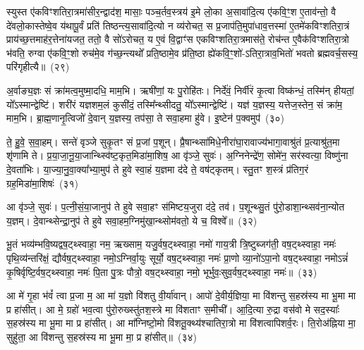 स्युस्त ए॑कविꣳशतिरा॒त्रमा॑सीर॒न्द्वाद॑श॒ मासाः॒ पञ्च॒र्तव॒स्त्रय॑ इ॒मे लो॒का अ॒सावा॑दि॒त्य ए॑कवि॒ꣳ॒श ए॒ताव॑न्तो॒ वै दे॑वलो॒कास्तेष्वे॒व य॑थापू॒र्वं प्रति॑ तिष्ठन्त्य॒सावा॑दि॒त्यो न व्य॑रोचत॒ स प्र॒जा\-प॑ति॒मुपा॑धाव॒त्तस्मा॑ ए॒तमे॑कविꣳशति\-रा॒त्रं प्राय॑च्छ॒त्तमाह॑र॒त्तेना॑यजत॒ ततो॒ वै सो॑\-ऽरोचत॒ य ए॒वं वि॒द्वाꣳ॑स एकविꣳशतिरा॒त्रमास॑ते॒ रोच॑न्त ए॒वैक॑विꣳशतिरा॒त्रो भ॑वति॒ रुग्वा ए॑कवि॒ꣳ॒शो रुच॑मे॒व ग॑च्छ॒न्त्यथो᳚ प्रति॒ष्ठामे॒व प्र॑ति॒ष्ठा ह्ये॑कवि॒ꣳ॒शो॑-\-ऽतिरा॒त्राव॒भितो॑ भवतो ब्रह्मवर्च॒सस्य॒ परि॑गृहीत्यै॥~(२९)

{\anuvakamend[{गृ॒ह्ण॒न्ति॒ दि॒वा॒की॒र्त्ये॑नै॒वोभ॒यतो॒ नाप्र॑तिष्ठिता॒ आस॑त॒ एक॑विꣳशतिश्च}]}%

अ॒र्वाङ्य॒ज्ञः सं क्रा॑मत्व॒मुष्मा॒दधि॒ माम॒भि। ऋषी॑णां॒ यः पु॒रोहि॑तः। निर्दे॑वं॒ निर्वी॑रं कृ॒त्वा विष्क॑न्धं॒ तस्मि॑न् हीयतां॒ यो᳚\-ऽस्मान्द्वेष्टि॑। शरी॑रं यज्ञशम॒लं कुसी॑दं॒ तस्मि᳚न्थ्सीदतु॒ यो᳚\-ऽस्मान्द्वेष्टि॑। यज्ञ॑ य॒ज्ञस्य॒ यत्तेज॒स्तेन॒ सं क्रा॑म॒ माम॒भि। ब्रा॒ह्म॒णानृ॒त्विजो॑ दे॒वान् य॒ज्ञस्य॒ तप॑सा॒ ते सवा॒हमा हु॑वे। इ॒ष्टेन॑ प॒क्वमुप॑~(३०)

ते॒ हु॒वे॒ स॒वा॒हम्। सन्ते॑ वृञ्जे सुकृ॒तꣳ सं प्र॒जां प॒शून्। प्रै॒षान्थ्सा॑मिधे॒नीरा॑घा॒रावाज्य॑भागा॒वाश्रु॑तं प्र॒त्याश्रु॑त॒मा शृ॑णामि ते। प्र॒या॒जा॒नू॒या॒जान्थ्स्वि॑ष्ट॒कृत॒मिडा॑मा॒शिष॒ आ वृ॑ञ्जे॒ सुवः॑। अ॒ग्निनेन्द्रे॑ण॒ सोमे॑न॒ सर॑स्वत्या॒ विष्णु॑ना दे॒वता॑भिः। या॒ज्या॒नु॒वा॒क्या᳚भ्या॒मुप॑ ते हुवे स्वा॒हं य॒ज्ञमा द॑दे ते॒ वष॑ट्कृतम्। स्तु॒तꣳ श॒स्त्रं प्र॑तिग॒रं ग्रह॒मिडा॑मा॒शिषः॑~(३१)

आ वृ॑ञ्जे॒ सुवः॑। प॒त्नी॒सं॒या॒जानुप॑ ते हुवे सवा॒हꣳ स॑मिष्टय॒जुरा द॑दे॒ तव॑। प॒शून्थ्सु॒तं पु॑रो॒डाशा॒न्थ्सव॑ना॒न्योत य॒ज्ञम्। दे॒वान्थ्सेन्द्रा॒नुप॑ ते हुवे सवा॒हम॒ग्निमु॑खा॒न्थ्सोम॑वतो॒ ये च॒ विश्वे᳚॥~(३२)

{\anuvakamend[{उप॒ ग्रह॒मिडा॑मा॒शिषो॒ द्वात्रिꣳ॑शच्च}]}%

भू॒तं भव्य॑म्भवि॒ष्यद्वष॒ट्थ्\-स्वाहा॒ नम॒ ऋख्साम॒ यजु॒र्वष॒ट्थ्\-स्वाहा॒ नमो॑ गाय॒त्री त्रि॒ष्टुब्जग॑ती॒ वष॒ट्थ्\-स्वाहा॒ नमः॑ पृथि॒व्य॑न्तरि॑क्षं॒ द्यौर्वष॒ट्थ्\-स्वाहा॒ नमो॒\-ऽग्निर्वा॒युः सूर्यो॒ वष॒ट्थ्\-स्वाहा॒ नमः॑ प्रा॒णो व्या॒नो॑\-ऽपा॒नो वष॒ट्थ्\-स्वाहा॒ नमो\-ऽन्नं॑ कृ॒षिर्वृष्टि॒र्वष॒ट्थ्\-स्वाहा॒ नमः॑ पि॒ता पु॒त्रः पौत्रो॒ वष॒ट्थ्\-स्वाहा॒ नमो॒ भूर्भुवः॒सुव॒र्वष॒ट्थ्\-स्वाहा॒ नमः॑॥~(३३)

{\anuvakamend[{भुव॑श्च॒त्वारि॑ च}]}%

आ मे॑ गृ॒हा भ॑वं᳚ त्वा प्र॒जा म॒ आ मा॑ य॒ज्ञो वि॑शतु वी॒र्या॑वान्। आपो॑ दे॒वीर्य॒ज्ञिया॒ मा वि॑शन्तु स॒हस्र॑स्य मा भू॒मा मा प्र हा॑सीत्। आ मे॒ ग्रहो॑ भव॒त्वा पु॑रो॒रुख्स्तु॑तश॒स्त्रे मा वि॑शताꣳ स॒मीची᳚। आ॒दि॒त्या रु॒द्रा वस॑वो मे सद॒स्याः᳚ स॒हस्र॑स्य मा भू॒मा मा प्र हा॑सीत्। आ मा᳚ग्निष्टो॒मो वि॑शतू॒क्थ्य॑श्चातिरा॒त्रो मा वि॑शत्वापिशर्व॒रः। ति॒रोअ॑ह्निया मा॒ सुहु॑ता॒ आ वि॑शन्तु स॒हस्र॑स्य मा भू॒मा मा॒ प्र हा॑सीत्॥~(३४)

